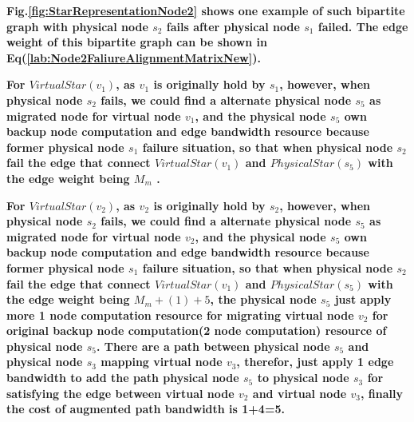 
\textbf{
Fig.\ref{fig:StarRepresentationNode2} shows one example of such  bipartite graph with physical node $s_2$ fails after physical node $s_1$ failed. The edge weight of this   bipartite graph can be shown in  Eq(\ref{lab:Node2FaliureAlignmentMatrixNew}).
}


\textbf{
For $VirtualStar(v_1)$, as $v_1$ is originally hold by $s_1$, however, when physical node $s_2$ fails, we could find a alternate physical node $s_5$ as migrated node for virtual node $v_1$, and the physical node $s_5$ own backup node computation and edge bandwidth resource because former physical node $s_1$ failure situation, so that when physical node $s_2$ fail the edge that connect $VirtualStar(v_1)$ and $PhysicalStar(s_5)$ with the edge weight being $M_m$ .
}

\textbf{
For $VirtualStar(v_2)$, as $v_2$ is originally hold by $s_2$, however, when physical node $s_2$ fails, we could find a alternate physical node $s_5$ as migrated node for virtual node $v_2$, and the physical node $s_5$ own backup node computation and edge bandwidth resource because former physical node $s_1$ failure situation, so that when physical node $s_2$ fail the edge that connect $VirtualStar(v_1)$ and $PhysicalStar(s_5)$ with the edge weight being $M_m+(1)+5$, the physical node $s_5$ just apply more 1 node computation resource for migrating virtual node $v_2$ for original backup node computation(2 node computation) resource of physical node $s_5$. There are a path between physical node $s_5$ and physical node $s_3$ mapping virtual node $v_3$, therefor, just apply 1 edge bandwidth to add the path physical node $s_5$ to physical node $s_3$ for satisfying the edge between virtual node $v_2$ and virtual node $v_3$, finally the cost of augmented path bandwidth is 1+4=5.
}

